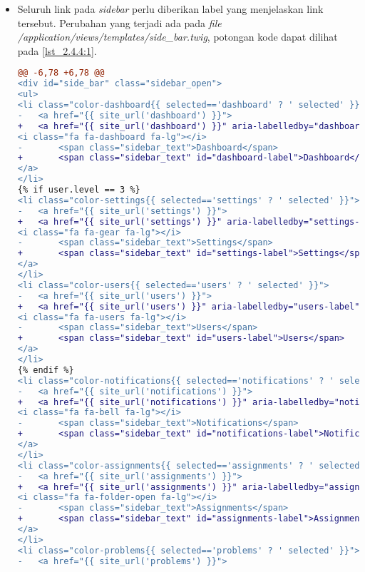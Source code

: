 \begin{itemize}
	\item Seluruh link pada \textit{sidebar} perlu diberikan label yang menjelaskan link tersebut. Perubahan yang terjadi ada pada \textit{file} \textit{/application/views/templates/side\_bar.twig}, potongan kode dapat dilihat pada \ref{lst_2.4.4:1}.
	
\begin{lstlisting}[language=diff, caption=Perubahan pada \textit{file} \textit{side\_bar.twig}, label=lst_2.4.4:1, basicstyle=\ttfamily, frame=single,
columns=fullflexible, keepspaces=true, breaklines=true]
@@ -6,78 +6,78 @@
<div id="side_bar" class="sidebar_open">
<ul>
<li class="color-dashboard{{ selected=='dashboard' ? ' selected' }}">
- 	<a href="{{ site_url('dashboard') }}">
+ 	<a href="{{ site_url('dashboard') }}" aria-labelledby="dashboard-label">
<i class="fa fa-dashboard fa-lg"></i>
- 		<span class="sidebar_text">Dashboard</span>
+ 		<span class="sidebar_text" id="dashboard-label">Dashboard</span>
</a>
</li>
{% if user.level == 3 %}
<li class="color-settings{{ selected=='settings' ? ' selected' }}">
- 	<a href="{{ site_url('settings') }}">
+ 	<a href="{{ site_url('settings') }}" aria-labelledby="settings-label">
<i class="fa fa-gear fa-lg"></i>
- 		<span class="sidebar_text">Settings</span>
+ 		<span class="sidebar_text" id="settings-label">Settings</span>
</a>
</li>
<li class="color-users{{ selected=='users' ? ' selected' }}">
- 	<a href="{{ site_url('users') }}">
+ 	<a href="{{ site_url('users') }}" aria-labelledby="users-label">
<i class="fa fa-users fa-lg"></i>
- 		<span class="sidebar_text">Users</span>
+ 		<span class="sidebar_text" id="users-label">Users</span>
</a>
</li>
{% endif %}
<li class="color-notifications{{ selected=='notifications' ? ' selected' }}">
- 	<a href="{{ site_url('notifications') }}">
+ 	<a href="{{ site_url('notifications') }}" aria-labelledby="notifications-label">
<i class="fa fa-bell fa-lg"></i>
- 		<span class="sidebar_text">Notifications</span>
+ 		<span class="sidebar_text" id="notifications-label">Notifications</span>
</a>
</li>
<li class="color-assignments{{ selected=='assignments' ? ' selected' }}">
- 	<a href="{{ site_url('assignments') }}">
+ 	<a href="{{ site_url('assignments') }}" aria-labelledby="assignments-label">
<i class="fa fa-folder-open fa-lg"></i>
- 		<span class="sidebar_text">Assignments</span>
+ 		<span class="sidebar_text" id="assignments-label">Assignments</span>
</a>
</li>
<li class="color-problems{{ selected=='problems' ? ' selected' }}">
- 	<a href="{{ site_url('problems') }}">

\end{lstlisting}
\end{itemize}

